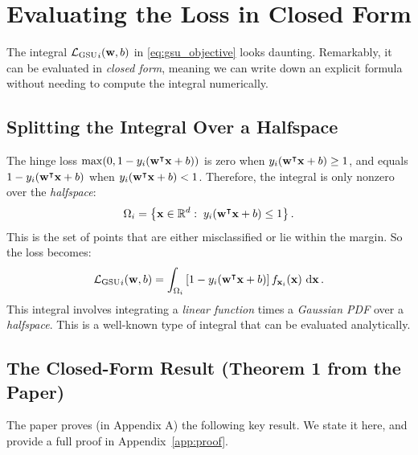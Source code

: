 \documentclass[11pt, letterpaper]{article}
\newcommand{\R}{\mathbb{R}}
\newcommand{\loss}{\mathcal{L}}
\begin{document}
\section{Evaluating the Loss in Closed Form}\label{sec:loss_closed_form}

The integral ${\loss_{\text{GSU}}}_{i}(\vb{w}, b)$ in \cref{eq:gsu_objective} looks daunting. Remarkably, it can be evaluated in \emph{closed form}, meaning we can write down an explicit formula without needing to compute the integral numerically.

\subsection{Splitting the Integral Over a Halfspace}

The hinge loss $\max(0, 1 - y_i(\vb{w}^{\intercal} \vb{x} + b))$ is zero when $y_i(\vb{w}^{\intercal} \vb{x} + b) \geq 1$, and equals $1 - y_i(\vb{w}^{\intercal} \vb{x} + b)$ when $y_i(\vb{w}^{\intercal} \vb{x} + b) < 1$. Therefore, the integral is only nonzero over the \emph{halfspace}:
\begin{equation}
    \Omega_i = \left\{ \vb{x} \in \R^d :\; y_i\!\left(\vb{w}^{\intercal} \vb{x} + b\right) \leq 1 \right\}.
\end{equation}
This is the set of points that are either misclassified or lie within the margin. So the loss becomes:
\begin{equation}\label{eq:loss_halfspace}
    {\loss_{\text{GSU}}}_{i}(\vb{w}, b) = \int_{\Omega_i} \left[1 - y_i\!\left(\vb{w}^{\intercal} \vb{x} + b\right)\right] f_{\vb{x}_i}(\vb{x})\, \dd{\vb{x}}.
\end{equation}
This integral involves integrating a \emph{linear function} times a \emph{Gaussian PDF} over a \emph{halfspace}. This is a well-known type of integral that can be evaluated analytically.

\subsection{The Closed-Form Result (Theorem 1 from the Paper)}

The paper proves (in Appendix A) the following key result. We state it here, and provide a full proof in Appendix~\ref{app:proof}.
\end{document}
